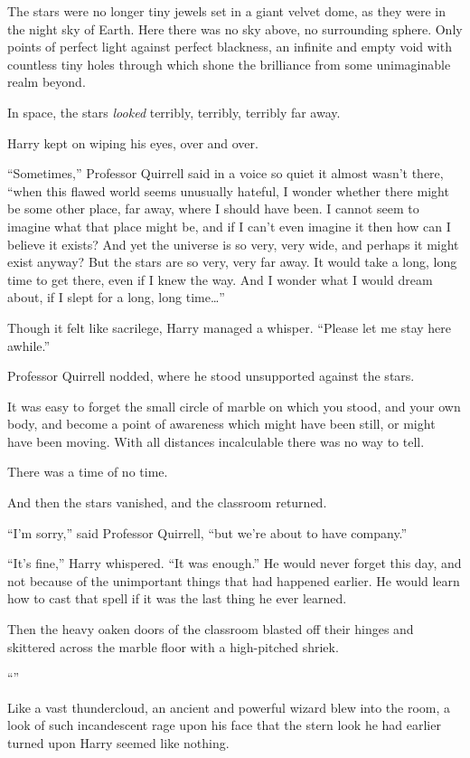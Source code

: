 The stars were no longer tiny jewels set in a giant velvet dome, as they were in the night sky of Earth. Here there was no sky above, no surrounding sphere. Only points of perfect light against perfect blackness, an infinite and empty void with countless tiny holes through which shone the brilliance from some unimaginable realm beyond.

In space, the stars \emph{looked} terribly, terribly, terribly far away.

Harry kept on wiping his eyes, over and over.

“Sometimes,” Professor Quirrell said in a voice so quiet it almost wasn’t there, “when this flawed world seems unusually hateful, I wonder whether there might be some other place, far away, where I should have been. I cannot seem to imagine what that place might be, and if I can’t even imagine it then how can I believe it exists? And yet the universe is so very, very wide, and perhaps it might exist anyway? But the stars are so very, very far away. It would take a long, long time to get there, even if I knew the way. And I wonder what I would dream about, if I slept for a long, long time…”

Though it felt like sacrilege, Harry managed a whisper. “Please let me stay here awhile.”

Professor Quirrell nodded, where he stood unsupported against the stars.

It was easy to forget the small circle of marble on which you stood, and your own body, and become a point of awareness which might have been still, or might have been moving. With all distances incalculable there was no way to tell.

There was a time of no time.

And then the stars vanished, and the classroom returned.

“I’m sorry,” said Professor Quirrell, “but we’re about to have company.”

“It’s fine,” Harry whispered. “It was enough.” He would never forget this day, and not because of the unimportant things that had happened earlier. He would learn how to cast that spell if it was the last thing he ever learned.

Then the heavy oaken doors of the classroom blasted off their hinges and skittered across the marble floor with a high-pitched shriek.

“”

Like a vast thundercloud, an ancient and powerful wizard blew into the room, a look of such incandescent rage upon his face that the stern look he had earlier turned upon Harry seemed like nothing.

